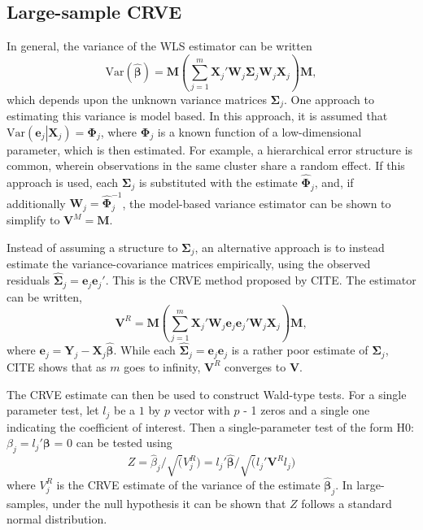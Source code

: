 \documentclass[12pt]{article}
\newcommand{\Var}{\text{Var}}
\newcommand{\bm}{\mathbf}
\newcommand{\bs}{\boldsymbol}
\begin{document}
\subsection{Large-sample CRVE }
In general, the variance of the WLS estimator can be written 
\begin{equation}
\label{eq:var_WLS}
\Var\left(\bs{\hat\beta}\right) = \bm{M}\left(\sum_{j=1}^m \bm{X}_j' \bm{W}_j \bs\Sigma_j \bm{W}_j\bm{X}_j\right) \bm{M},
\end{equation}
which depends upon the unknown variance matrices $\bm\Sigma_j$. One approach to estimating this variance is model based. In this approach, it is assumed that $\Var\left(\bm{e}_j\left|\bm{X}_j\right.\right) = \bs\Phi_j$, where $\bs\Phi_j$ is a known function of a low-dimensional parameter, which is then estimated. For example, a hierarchical error structure is common, wherein observations in the same cluster share a random effect. If this approach is used, each $\bs\Sigma_j$ is substituted with the estimate $\hat{\bs\Phi}_j$, and, if additionally $\bm{W}_j = \hat{\bs\Phi}_j^{-1}$, the model-based variance estimator can be shown to simplify to $\bm{V}^M = \bm{M}$. 

Instead of assuming a structure to $\bs\Sigma_j$, an alternative approach is to instead estimate the variance-covariance matrices empirically, using the observed residuals $\hat{\bs\Sigma}_j = \bm{e}_j \bm{e}_j'$. This is the CRVE method proposed by CITE. The estimator can be written,
\begin{equation}
\label{eq:V_R}
\bm{V}^{R} = \bm{M}\left(\sum_{j=1}^m \bm{X}_j'\bm{W}_j \bm{e}_j \bm{e}_j'\bm{W}_j \bm{X}_j\right) \bm{M},
\end{equation}
where $\bm{e}_j = \bm{Y}_j - \bm{X}_j \bs{\hat\beta}$. While each $\hat{\bs\Sigma}_j = \bm{e}_j \bm{e}_j$ is a rather poor estimate of $\bs\Sigma_j$, CITE shows that as $m$ goes to infinity, $\bm{V}^{R}$ converges to $\bm{V}$. 

The CRVE estimate can then be used to construct Wald-type tests. For a single parameter test, let $l_j$ be a $1$ by $p$ vector with $p$ - 1 zeros and a single one indicating the coefficient of interest. Then a single-parameter test of the form H0: ${\beta}_j = l_j'{\bs\beta}$ = 0 can be tested using 
\begin{equation}
\label{eq:ttest}
Z = \hat{\beta}_j/\sqrt({V}_j^{R}) = l_j'\hat{\bs\beta}/\sqrt(l_j'{\bm{V}}^{R}l_j)
\end{equation}
where ${V}_j^{R}$ is the CRVE estimate of the variance of the estimate $\hat{\bs\beta}_j$. In large-samples, under the null hypothesis it can be shown that $Z$ follows a standard normal distribution. 
\end{document}
